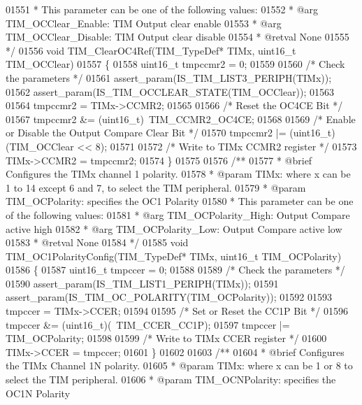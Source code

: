 \begin{DoxyCode}
01551 \textcolor{comment}{  *          This parameter can be one of the following values:}
01552 \textcolor{comment}{  *            @arg TIM\_OCClear\_Enable: TIM Output clear enable}
01553 \textcolor{comment}{  *            @arg TIM\_OCClear\_Disable: TIM Output clear disable}
01554 \textcolor{comment}{  * @retval None}
01555 \textcolor{comment}{  */}
01556 \textcolor{keywordtype}{void} TIM_ClearOC4Ref(TIM\_TypeDef* TIMx, uint16\_t TIM\_OCClear)
01557 \{
01558   uint16\_t tmpccmr2 = 0;
01559 
01560   \textcolor{comment}{/* Check the parameters */}
01561   assert_param(IS\_TIM\_LIST3\_PERIPH(TIMx));
01562   assert_param(IS\_TIM\_OCCLEAR\_STATE(TIM\_OCClear));
01563 
01564   tmpccmr2 = TIMx->CCMR2;
01565 
01566   \textcolor{comment}{/* Reset the OC4CE Bit */}
01567   tmpccmr2 &= (uint16\_t)~TIM_CCMR2_OC4CE;
01568 
01569   \textcolor{comment}{/* Enable or Disable the Output Compare Clear Bit */}
01570   tmpccmr2 |= (uint16\_t)(TIM\_OCClear << 8);
01571 
01572   \textcolor{comment}{/* Write to TIMx CCMR2 register */}
01573   TIMx->CCMR2 = tmpccmr2;
01574 \}
01575 
01576 \textcolor{comment}{/**}
01577 \textcolor{comment}{  * @brief  Configures the TIMx channel 1 polarity.}
01578 \textcolor{comment}{  * @param  TIMx: where x can be 1 to 14 except 6 and 7, to select the TIM peripheral.}
01579 \textcolor{comment}{  * @param  TIM\_OCPolarity: specifies the OC1 Polarity}
01580 \textcolor{comment}{  *          This parameter can be one of the following values:}
01581 \textcolor{comment}{  *            @arg TIM\_OCPolarity\_High: Output Compare active high}
01582 \textcolor{comment}{  *            @arg TIM\_OCPolarity\_Low: Output Compare active low}
01583 \textcolor{comment}{  * @retval None}
01584 \textcolor{comment}{  */}
01585 \textcolor{keywordtype}{void} TIM_OC1PolarityConfig(TIM\_TypeDef* TIMx, uint16\_t TIM\_OCPolarity)
01586 \{
01587   uint16\_t tmpccer = 0;
01588 
01589   \textcolor{comment}{/* Check the parameters */}
01590   assert_param(IS\_TIM\_LIST1\_PERIPH(TIMx));
01591   assert_param(IS\_TIM\_OC\_POLARITY(TIM\_OCPolarity));
01592 
01593   tmpccer = TIMx->CCER;
01594 
01595   \textcolor{comment}{/* Set or Reset the CC1P Bit */}
01596   tmpccer &= (uint16\_t)(~TIM_CCER_CC1P);
01597   tmpccer |= TIM\_OCPolarity;
01598 
01599   \textcolor{comment}{/* Write to TIMx CCER register */}
01600   TIMx->CCER = tmpccer;
01601 \}
01602 
01603 \textcolor{comment}{/**}
01604 \textcolor{comment}{  * @brief  Configures the TIMx Channel 1N polarity.}
01605 \textcolor{comment}{  * @param  TIMx: where x can be 1 or 8 to select the TIM peripheral.}
01606 \textcolor{comment}{  * @param  TIM\_OCNPolarity: specifies the OC1N Polarity}

\end{DoxyCode}
